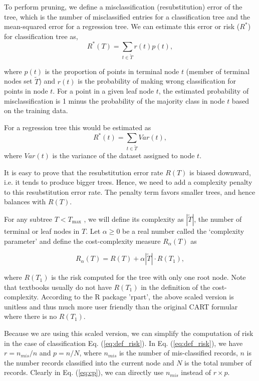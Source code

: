 To perform pruning, we define a misclassification (resubstitution) error of the
tree, which is the number of misclassified entries for a classification tree and
the mean-squared error for a regression tree. We can estimate this
error or risk ($R^*$)
for classification tree as,
\begin{equation}
    \label{eq:def_risk}
    R^*(T) = \sum_{t \in \tilde{T}} r(t) p(t),
\end{equation}

where $p(t)$ is the proportion of points in terminal node $t$ (member of
terminal nodes set $\tilde{T}$) and $r(t)$ is the probability of making wrong
classification for points in node $t$. For a point in a given leaf node $t$, the
estimated probability of misclassification is 1 minus the probability of the
majority class in node $t$ based on the training data.

For a regression tree this would be estimated as
$$
    R^*(t) = \sum_{t \in \tilde{T}} Var(t),
$$
where $Var(t)$ is the variance of the dataset assigned to node $t$.

It is easy to prove that the resubstitution error rate $R(T)$ is biased downward,
i.e. it tends to produce bigger trees. Hence, we need to add a complexity penalty
to this resubstitution error rate. The penalty term favors smaller trees, and
hence balances with $R(T)$.

For any subtree $T < T_{\text{max}}$ , we will define its complexity as
$|\tilde{T}|$, the number of terminal or leaf nodes in $T$. Let $\alpha \ge 0$
be a real number called the `complexity parameter' and define the cost-complexity
measure $R_{\alpha}(T)$ as

\begin{equation}
    \label{eq:cp}
    R_{\alpha}(T) = R(T) + \alpha |\tilde{T}|\cdot R(T_1),
\end{equation}

where $R(T_1)$ is the risk computed for the tree with only one root
node. Note that textbooks usually do not have $R(T_1)$ in the
definition of the cost-complexity. According to the R package 'rpart',
the above scaled version is unitless and thus much more user friendly
than the original CART formular where there is no $R(T_1)$.

Because we are using this scaled version, we can simplify the
computation of risk in the case of classification Eq.
(\ref{eq:def_risk}). In Eq. (\ref{eq:def_risk}), we have $r =
n_{mis}/n$ and $p = n/N$, where $n_{mis}$ is the number of
mis-classified records, $n$ is the number records classified into the
current node and $N$ is the total number of records. Clearly in Eq.
(\ref{eq:cp}), we can directly use $n_{mis}$ instead of $r \times p$.

